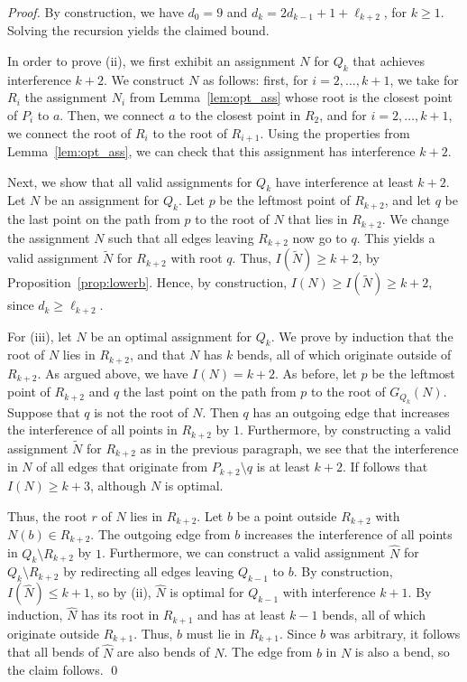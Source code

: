 \documentclass[envcountsect,envcountsame,runningheads,a4paper]{llncs}
\begin{document}
\begin{proof}
By construction, we have $d_0 = 9$ and  $d_k = 2d_{k-1} + 1 + \ell_{k+2}$,
for $k \geq 1$.  Solving the recursion yields the claimed bound.

In order to prove (ii), we first exhibit an assignment
$N$ for $Q_k$ that achieves interference
$k+2$. We construct $N$ as follows: first, for
$i = 2, \dots, k+1$, we take for $R_i$
the assignment $N_i$ from
Lemma~\ref{lem:opt_ass} whose root is
the closest point of $P_i$ to $a$. Then, we
connect $a$ to the closest point in $R_2$, and
for $i = 2, \dots, k+1$,
we connect the root of $R_i$ to the root of
$R_{i+1}$. Using the properties
from Lemma~\ref{lem:opt_ass}, we can check
that this
assignment has interference $k+2$.

Next, we show that all valid assignments for
$Q_k$ have interference at least $k+2$.
Let $N$ be an assignment for $Q_k$.
Let $p$ be the leftmost point of
$R_{k+2}$, and let $q$ be the last point on the
path from $p$ to the root of $N$ that lies
in $R_{k+2}$.
We change the assignment $N$ such that all
edges leaving $R_{k+2}$ now go to
$q$. This yields a valid assignment $\widetilde{N}$
for $R_{k+2}$ with root $q$. Thus, $I(\widetilde{N}) \geq k+2$,
by Proposition~\ref{prop:lowerb}. Hence,
by construction, $I(N) \geq I(\widetilde{N}) \geq k+2$, since
$d_k \geq \ell_{k+2}$.

For (iii), let $N$ be an optimal assignment for $Q_k$.
We prove by induction that the root of
$N$ lies in $R_{k+2}$, and that $N$ has $k$ bends,
all of which originate outside of $R_{k+2}$.
As argued above, we have $I(N) = k+2$.
As before, let $p$ be the leftmost point of $R_{k+2}$
and $q$ the last point on the path from $p$ to
the root of $G_{Q_k}(N)$. Suppose that $q$ is not
the root of $N$. Then $q$ has an outgoing edge that
increases the interference of all points in $R_{k+2}$
by $1$. Furthermore, by constructing a valid assignment
$\widetilde{N}$ for $R_{k+2}$ as in the previous paragraph,
we see that the interference in $N$ of all edges that originate
from $P_{k+2} \setminus q$
is at least $k+2$. If follows that $I(N) \geq k + 3$,
although $N$ is optimal.

Thus, the root $r$ of $N$ lies in $R_{k+2}$. Let $b$ be a
point outside $R_{k+2}$ with $N(b) \in R_{k+2}$.
The outgoing edge from $b$ increases
the interference of all points in $Q_k \setminus R_{k+2}$
by $1$. Furthermore, we can construct a valid assignment
$\widehat{N}$ for $Q_k \setminus R_{k+2}$ by redirecting all
edges leaving $Q_{k-1}$ to $b$. By construction, $I(\widehat{N}) \leq k+1$,
so by (ii), $\widehat{N}$ is optimal for $Q_{k-1}$
with interference $k+1$. By induction, $\widehat{N}$ has its root
in $R_{k+1}$ and has at least $k-1$ bends, all of which originate
outside $R_{k+1}$. Thus, $b$ must lie in $R_{k+1}$.
Since $b$ was arbitrary, it follows that all bends of $\widehat{N}$
are also bends of $N$. The edge from $b$ in $N$ is
also a bend, so the claim follows.
\qed{}
\end{proof}
\end{document}
